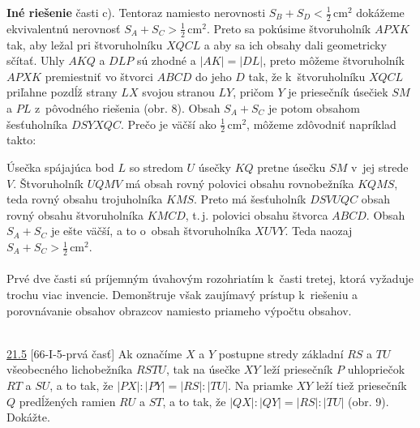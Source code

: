 \textbf{Iné riešenie} časti c). Tentoraz namiesto nerovnosti $S_B + S_ D < \frac{1}{2}$\,cm$^2$ dokážeme ekvivalentnú nerovnosť $S_A +S_C >\frac{1}{2}$\,cm$^2$. Preto sa pokúsime  štvoruholník $APXK$ tak, aby ležal pri štvoruholníku $XQCL$ a aby sa ich obsahy dali geometricky sčítať. Uhly $AKQ$ a $DLP$ sú zhodné a $| AK | = | DL |$, preto môžeme štvoruholník $APXK$ premiestniť vo štvorci $ABCD$ do jeho  $D$ tak, že k~štvoruholníku $XQCL$ priľahne pozdĺž strany $LX$ svojou stranou $LY$, pričom $Y$ je priesečník úsečiek $SM$ a $PL$ z~pôvodného riešenia (obr. 8). Obsah $S_A + S_C$ je potom obsahom šesťuholníka $DSYXQC$. Prečo je väčší ako $\frac{1}{2}$\,cm$^2$, môžeme zdôvodniť napríklad takto:

Úsečka spájajúca bod $L$ so stredom $U$ úsečky $KQ$ pretne úsečku $SM$ v~jej strede $V$. Štvoruholník $UQMV$ má obsah rovný polovici obsahu rovnobežníka $KQMS$, teda rovný obsahu trojuholníka $KMS$. Preto má šesťuholník $DSV UQC$ obsah rovný obsahu štvoruholníka $KMCD$,  t.\,j. polovici obsahu štvorca $ABCD$. Obsah $S_A +S_C$ je ešte väčší, a to o~obsah štvoruholníka $XUVY$. Teda naozaj $S_A + S_C >\frac{1}{2}$\,cm$^2$.\\
\\
\kom Prvé dve časti sú príjemným úvahovým rozohriatím k~časti tretej, ktorá vyžaduje trochu viac invencie. Demonštruje však zaujímavý prístup k~riešeniu a porovnávanie obsahov obrazcov namiesto priameho výpočtu obsahov.\\
\\
\begin{tcolorbox}[breakable,notitle,boxrule=0pt,colback=light-gray,colframe=light-gray]\ul{21.5} [66-I-5-prvá časť] Ak označíme $X$ a $Y$ postupne stredy základní $RS$ a $TU$ všeobecného lichobežníka $RSTU$, tak na úsečke $XY$ leží priesečník $P$ uhlopriečok $RT$ a $SU$, a to tak, že $|PX| : |PY | = |RS| : |TU|$. Na priamke $XY$ leží tiež priesečník $Q$ predĺžených ramien $RU$ a $ST$, a to tak, že $|QX| : |QY | = |RS| : |TU|$ (obr. 9). Dokážte.

\end{tcolorbox}

